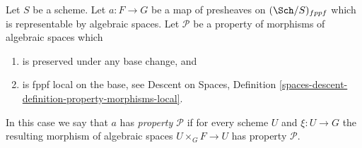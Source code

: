 \begin{definition}
\label{definition-property-transformation}
Let $S$ be a scheme. Let $a : F \to G$ be a map of presheaves on
$(\Sch/S)_{fppf}$ which is representable by algebraic spaces.
Let $\mathcal{P}$ be a property of morphisms of algebraic spaces which
\begin{enumerate}
\item is preserved under any base change, and
\item is fppf local on the base, see
Descent on Spaces,
Definition \ref{spaces-descent-definition-property-morphisms-local}.
\end{enumerate}
In this case we say that $a$ has {\it property $\mathcal{P}$} if for every
scheme $U$ and $\xi : U \to G$ the resulting morphism of algebraic spaces
$U \times_G F \to U$ has property $\mathcal{P}$.
\end{definition}